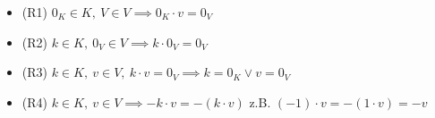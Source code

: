 \documentclass{../tudscript}
\begin{document}
\hypertarget{rechengesetze-fuxfcr-vektoren}{%
\label{rechengesetze-fuxfcr-vektoren}}

\begin{itemize}
\item
  (R1) \(0_K \in K, \> V \in V \implies 0_K \boxed{\cdot} v = 0_V\)
\item
  (R2) \(k \in K, \> 0_V \in V \implies k \boxed{\cdot} 0_V = 0_V\)
\item
  (R3)
  \(k \in K, \> v \in V, \> k \boxed{\cdot} v = 0_V \implies k = 0_K \vee v=0_V\)
\item
  (R4)
  \(k \in K, \> v \in V \implies -k \boxed{\cdot} v = -(k \boxed{\cdot} v)\)
  \hfill\quad\linebreak z.B.
  \((-1) \boxed{\cdot} v = - (1 \boxed{\cdot} v) = -v\)
\end{itemize}

\hypertarget{beweis-r1}{%
\label{beweis-r1}}
\end{document}
